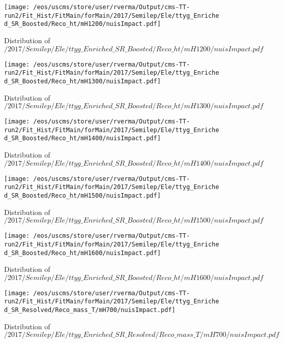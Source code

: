 \begin{figure}
\centering
\texttt{[image: /eos/uscms/store/user/rverma/Output/cms-TT-run2/Fit\_Hist/FitMain/forMain/2017/Semilep/Ele/ttyg\_Enriched\_SR\_Boosted/Reco\_ht/mH1200/nuisImpact.pdf]}
\caption{Distribution of $/2017/Semilep/Ele/ttyg\_Enriched\_SR\_Boosted/Reco\_ht/mH1200/nuisImpact.pdf$}
\end{figure}

\begin{figure}
\centering
\texttt{[image: /eos/uscms/store/user/rverma/Output/cms-TT-run2/Fit\_Hist/FitMain/forMain/2017/Semilep/Ele/ttyg\_Enriched\_SR\_Boosted/Reco\_ht/mH1300/nuisImpact.pdf]}
\caption{Distribution of $/2017/Semilep/Ele/ttyg\_Enriched\_SR\_Boosted/Reco\_ht/mH1300/nuisImpact.pdf$}
\end{figure}

\begin{figure}
\centering
\texttt{[image: /eos/uscms/store/user/rverma/Output/cms-TT-run2/Fit\_Hist/FitMain/forMain/2017/Semilep/Ele/ttyg\_Enriched\_SR\_Boosted/Reco\_ht/mH1400/nuisImpact.pdf]}
\caption{Distribution of $/2017/Semilep/Ele/ttyg\_Enriched\_SR\_Boosted/Reco\_ht/mH1400/nuisImpact.pdf$}
\end{figure}

\begin{figure}
\centering
\texttt{[image: /eos/uscms/store/user/rverma/Output/cms-TT-run2/Fit\_Hist/FitMain/forMain/2017/Semilep/Ele/ttyg\_Enriched\_SR\_Boosted/Reco\_ht/mH1500/nuisImpact.pdf]}
\caption{Distribution of $/2017/Semilep/Ele/ttyg\_Enriched\_SR\_Boosted/Reco\_ht/mH1500/nuisImpact.pdf$}
\end{figure}

\begin{figure}
\centering
\texttt{[image: /eos/uscms/store/user/rverma/Output/cms-TT-run2/Fit\_Hist/FitMain/forMain/2017/Semilep/Ele/ttyg\_Enriched\_SR\_Boosted/Reco\_ht/mH1600/nuisImpact.pdf]}
\caption{Distribution of $/2017/Semilep/Ele/ttyg\_Enriched\_SR\_Boosted/Reco\_ht/mH1600/nuisImpact.pdf$}
\end{figure}

\begin{figure}
\centering
\texttt{[image: /eos/uscms/store/user/rverma/Output/cms-TT-run2/Fit\_Hist/FitMain/forMain/2017/Semilep/Ele/ttyg\_Enriched\_SR\_Resolved/Reco\_mass\_T/mH700/nuisImpact.pdf]}
\caption{Distribution of $/2017/Semilep/Ele/ttyg\_Enriched\_SR\_Resolved/Reco\_mass\_T/mH700/nuisImpact.pdf$}
\end{figure}

